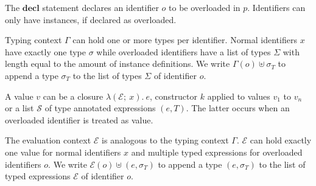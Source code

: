 \documentclass[runningheads]{llncs}
\begin{document}
The $\textbf{decl}$ statement declares an identifier $o$ to be overloaded in $p$. Identifiers can only have instances, if declared as overloaded.

Typing context $\Gamma$ can hold one or more types per identifier. 
Normal identifiers $x$ have exactly one type $\sigma$ while overloaded identifiers have a list of types $\Sigma$ with length equal to the amount of instance definitions. 
We write $\Gamma(o) \uplus \sigma_T$ to append a type $\sigma_T$ to the list of types $\Sigma$ of identifier $o$.

A value $v$ can be a closure $\lambda (\mathcal{E}; \ x). \ e$, constructor $k$ applied to values $v_1$ to $v_n$ or a list $\mathcal{S}$ of type annotated expressions $(e, T)$. The latter occurs when an overloaded identifier is treated as value. 

The evaluation context $\mathcal{E}$ is analogous to the typing context $\Gamma$. 
$\mathcal{E}$ can hold exactly one value for normal identifiers $x$ and multiple typed expressions for overloaded identifiers $o$. 
We write $\mathcal{E}(o) \uplus (e, \sigma_T)$ to append a type $(e, \sigma_T)$ to the list of typed expressions $\mathcal{E}$ of identifier $o$.
\end{document}
